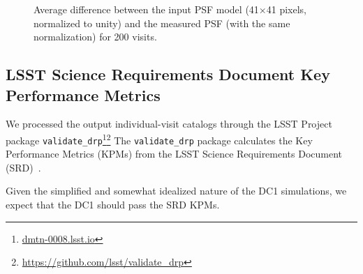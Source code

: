 \documentclass[twocolumn]{aastex62}
\begin{document}
\begin{figure}
\centering
{}

\caption{Average difference between the input PSF model (41$\times$41 pixels, normalized to unity) and the measured PSF (with the same normalization) for 200 visits.}
\label{fig:psf_residual}
\end{figure}

\subsection{LSST Science Requirements Document Key Performance Metrics}

We processed the output individual-visit catalogs through the LSST Project package \texttt{validate\_drp}\footnote{\url{dmtn-0008.lsst.io}}\footnote{\url{https://github.com/lsst/validate_drp}}
The \texttt{validate\_drp} package calculates the Key Performance Metrics (KPMs) from the LSST Science Requirements Document (SRD)~\citep{LPM-17}.

Given the simplified and somewhat idealized nature of the DC1 simulations, we expect that the DC1 should pass the SRD KPMs.
\end{document}
